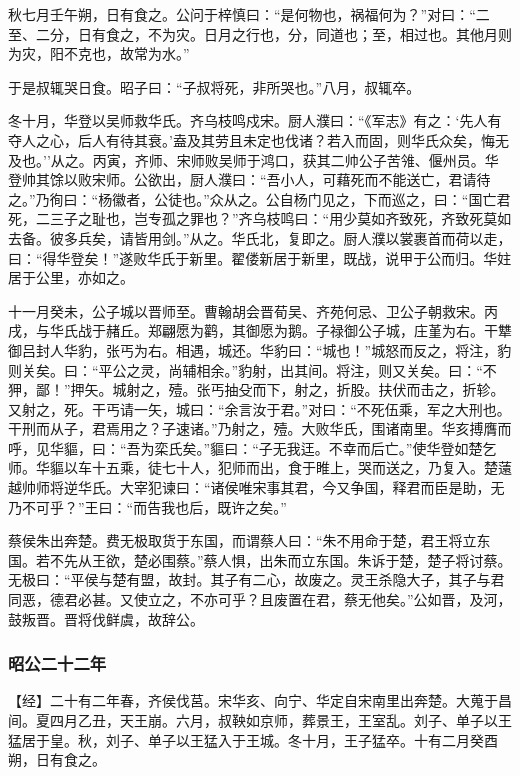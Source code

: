 \documentclass[]{article}
\begin{document}
秋七月壬午朔，日有食之。公问于梓慎曰：``是何物也，祸福何为？''对曰：``二至、二分，日有食之，不为灾。日月之行也，分，同道也；至，相过也。其他月则为灾，阳不克也，故常为水。''

于是叔辄哭日食。昭子曰：``子叔将死，非所哭也。''八月，叔辄卒。

冬十月，华登以吴师救华氏。齐乌枝鸣戍宋。厨人濮曰：``《军志》有之：`先人有夺人之心，后人有待其衰。'盍及其劳且未定也伐诸？若入而固，则华氏众矣，悔无及也。''从之。丙寅，齐师、宋师败吴师于鸿口，获其二帅公子苦雂、偃州员。华登帅其馀以败宋师。公欲出，厨人濮曰：``吾小人，可藉死而不能送亡，君请待之。''乃徇曰：``杨徽者，公徒也。''众从之。公自杨门见之，下而巡之，曰：``国亡君死，二三子之耻也，岂专孤之罪也？''齐乌枝鸣曰：``用少莫如齐致死，齐致死莫如去备。彼多兵矣，请皆用剑。''从之。华氏北，复即之。厨人濮以裳裹首而荷以走，曰：``得华登矣！''遂败华氏于新里。翟偻新居于新里，既战，说甲于公而归。华妵居于公里，亦如之。

十一月癸未，公子城以晋师至。曹翰胡会晋荀吴、齐苑何忌、卫公子朝救宋。丙戌，与华氏战于赭丘。郑翩愿为鹳，其御愿为鹅。子禄御公子城，庄堇为右。干犨御吕封人华豹，张丐为右。相遇，城还。华豹曰：``城也！''城怒而反之，将注，豹则关矣。曰：``平公之灵，尚辅相余。''豹射，出其间。将注，则又关矣。曰：``不狎，鄙！''押矢。城射之，殪。张丐抽殳而下，射之，折股。扶伏而击之，折轸。又射之，死。干丐请一矢，城曰：``余言汝于君。''对曰：``不死伍乘，军之大刑也。干刑而从子，君焉用之？子速诸。''乃射之，殪。大败华氏，围诸南里。华亥搏膺而呼，见华貙，曰：``吾为栾氏矣。''貙曰：``子无我迋。不幸而后亡。''使华登如楚乞师。华貙以车十五乘，徒七十人，犯师而出，食于睢上，哭而送之，乃复入。楚薳越帅师将逆华氏。大宰犯谏曰：``诸侯唯宋事其君，今又争国，释君而臣是助，无乃不可乎？''王曰：``而告我也后，既许之矣。''

蔡侯朱出奔楚。费无极取货于东国，而谓蔡人曰：``朱不用命于楚，君王将立东国。若不先从王欲，楚必围蔡。''蔡人惧，出朱而立东国。朱诉于楚，楚子将讨蔡。无极曰：``平侯与楚有盟，故封。其子有二心，故废之。灵王杀隐大子，其子与君同恶，德君必甚。又使立之，不亦可乎？且废置在君，蔡无他矣。''公如晋，及河，鼓叛晋。晋将伐鲜虞，故辞公。

\hypertarget{header-n2725}{%
\subsubsection{昭公二十二年}\label{header-n2725}}

【经】二十有二年春，齐侯伐莒。宋华亥、向宁、华定自宋南里出奔楚。大蒐于昌间。夏四月乙丑，天王崩。六月，叔鞅如京师，葬景王，王室乱。刘子、单子以王猛居于皇。秋，刘子、单子以王猛入于王城。冬十月，王子猛卒。十有二月癸酉朔，日有食之。
\end{document}
